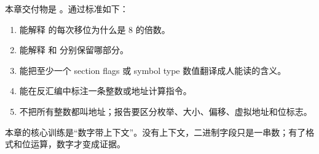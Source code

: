 
本章交付物是 。通过标准如下：

\begin{enumerate}
  \item 能解释  的每次移位为什么是 8 的倍数。
  \item 能解释  和  分别保留哪部分。
  \item 能把至少一个 section flags 或 symbol type 数值翻译成人能读的含义。
  \item 能在反汇编中标注一条整数或地址计算指令。
  \item 不把所有整数都叫地址；报告要区分枚举、大小、偏移、虚拟地址和位标志。
\end{enumerate}

本章的核心训练是“数字带上下文”。没有上下文，二进制字段只是一串数；有了格式和位运算，数字才变成证据。
